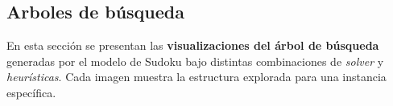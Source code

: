 
\subsection{Arboles de búsqueda}\label{sec:arboles}

En esta sección se presentan las \textbf{visualizaciones del árbol de búsqueda} generadas por el modelo de Sudoku bajo distintas combinaciones de \emph{solver} y \emph{heurísticas}. Cada imagen muestra la estructura explorada para una instancia específica.



